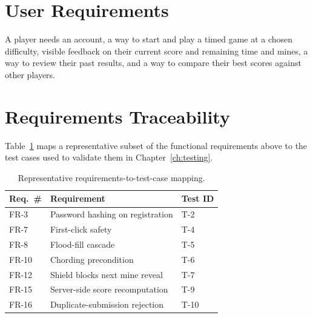 \section{User Requirements}
A player needs an account, a way to start and play a timed game at a chosen
difficulty, visible feedback on their current score and remaining time and
mines, a way to review their past results, and a way to compare their best
scores against other players.

\section{Requirements Traceability}
Table~\ref{tab:req-trace} maps a representative subset of the functional
requirements above to the test cases used to validate them in
Chapter~\ref{ch:testing}.

\begin{table}[h]
\centering
\caption{Representative requirements-to-test-case mapping.}
\label{tab:req-trace}
\begin{tabular}{@{}p{2.2cm}p{9cm}p{1.5cm}@{}}
\toprule
\textbf{Req.\ \#} & \textbf{Requirement} & \textbf{Test ID} \\
\midrule
FR-3  & Password hashing on registration & T-2 \\
FR-7  & First-click safety & T-4 \\
FR-8  & Flood-fill cascade & T-5 \\
FR-10 & Chording precondition & T-6 \\
FR-12 & Shield blocks next mine reveal & T-7 \\
FR-15 & Server-side score recomputation & T-9 \\
FR-16 & Duplicate-submission rejection & T-10 \\
\bottomrule
\end{tabular}
\end{table}
